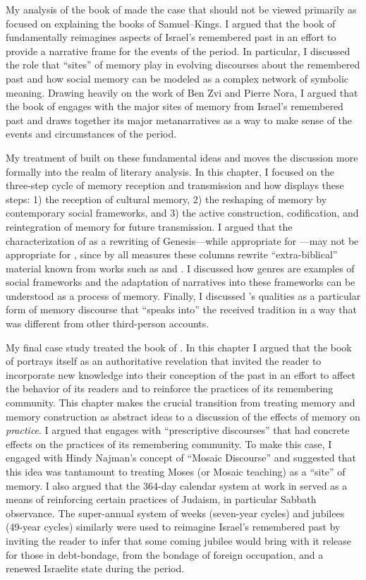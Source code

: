 My analysis of the book of \chronicles made the case that \chronicles should not be viewed primarily as focused on explaining the books of Samuel--Kings. I argued that the book of \chronicles fundamentally reimagines aspects of Israel's remembered past in an effort to provide a narrative frame for the events of the \secondtemple period. In particular, I discussed the role that ``sites'' of memory play in evolving discourses about the remembered past and how social memory can be modeled as a complex network of symbolic meaning.  Drawing heavily on the work of Ben Zvi and Pierre Nora, I argued that the book of \chronicles engages with the major sites of memory from Israel's remembered past and draws together its major metanarratives as a way to make sense of the events and circumstances of the \secondtemple period.

My treatment of \ga built on these fundamental ideas and moves the discussion more formally into the realm of literary analysis. In this chapter, I focused on the three-step cycle of memory reception and transmission and how \ga displays these steps: 1) the reception of cultural memory, 2) the reshaping of memory by contemporary social frameworks, and 3) the active construction, codification, and reintegration of memory for future transmission. I argued that the characterization of \ga as a rewriting of Genesis---while appropriate for ---may not be appropriate for , since by all measures these columns rewrite ``extra-biblical'' material known from works such as \firstenoch and \jub. I discussed how genres are examples of social frameworks and the adaptation of \ga narratives into these frameworks can be understood as a process of memory. Finally, I discussed \ga's \psgraphical qualities as a particular form of memory discourse that ``speaks into'' the received tradition in a way that was different from other third-person accounts.

My final case study treated the book of \jub. In this chapter I argued that the book of \jub portrays itself as an authoritative revelation that invited the reader to incorporate new knowledge into their conception of the past in an effort to affect the behavior of its readers and to reinforce the practices of its remembering community. This chapter makes the crucial transition from treating memory and memory construction as abstract ideas to a discussion of the effects of memory on \emph{practice}. I argued that \jub engages with ``prescriptive discourses'' that had concrete effects on the practices of its remembering community. To make this case, I engaged with Hindy Najman's concept of ``Mosaic Discourse'' and suggested that this idea was tantamount to treating Moses (or Mosaic teaching) as a ``site'' of memory. I also argued that the 364-day calendar system at work in \jub served as a means of reinforcing certain practices of \secondtemple Judaism, in particular Sabbath observance. The super-annual system of weeks (seven-year cycles) and jubilees (49-year cycles) similarly were used to reimagine Israel's remembered past by inviting the reader to infer that some coming jubilee would bring with it release for those in debt-bondage, from the bondage of foreign occupation, and a renewed Israelite state during the \secondtemple period.

